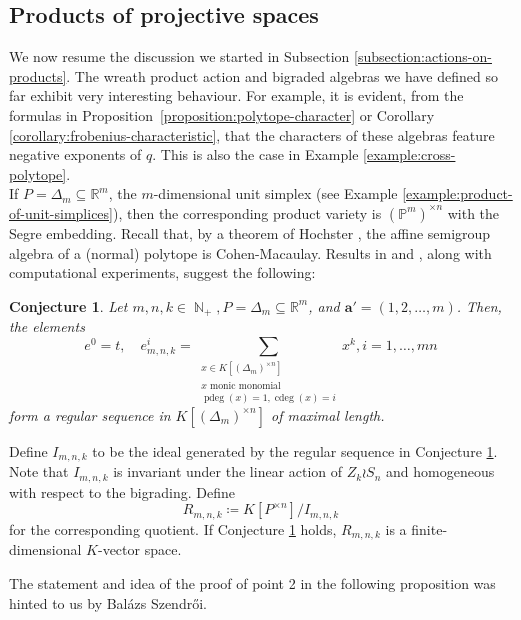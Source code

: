\documentclass[a4paper,12pt]{amsart}
\theoremstyle{plain}
\newtheorem{conjecture}[theorem]{Conjecture}
\theoremstyle{definition}
\theoremstyle{remark}
\DeclareMathOperator{\NN}{\mathbb{N}}
\DeclareMathOperator{\cdeg}{cdeg}
\DeclareMathOperator{\pdeg}{pdeg}
\begin{document}
\subsection{Products of projective spaces}\label{subsection:products-of-projective-spaces}
We now resume the discussion we started in Subsection \ref{subsection:actions-on-products}. The wreath product action and bigraded algebras we have defined so far exhibit very interesting behaviour. For example, it is evident, from the formulas in Proposition~\ref{proposition:polytope-character} or Corollary \ref{corollary:frobenius-characteristic}, that the characters of these algebras feature negative exponents of $q$. This is also the case in Example \ref{example:cross-polytope}. \\

If $P = \Delta_m \subseteq \mathbb{R}^m$, the $m$-dimensional unit simplex (see Example \ref{example:product-of-unit-simplices}), then the corresponding product variety is $(\mathbb{P}^m)^{\times n}$ with the Segre embedding. Recall that, by a theorem of Hochster \cite{hochster-rings}, the affine semigroup algebra of a (normal) polytope is Cohen-Macaulay. Results in \cite{adeyemo-szendroi-refined} and \cite{braun-olsen-statistics}, along with computational experiments, suggest the following:

\begin{conjecture}\label{conjecture:regular-sequence}
    Let $m, n, k \in \NN_+, P = \Delta_m \subseteq \mathbb{R}^m$, and $\bm{a}' = (1, 2,\ldots, m)$. Then, the elements
    \[
    e^0 = t, \quad e^i_{m, n, k} = \sum_{\substack{x \in K[(\Delta_m)^{\times n}]\\x \text{ monic monomial}\\\pdeg(x) = 1, \cdeg(x) = i}} x^k, i = 1, \ldots, mn
    \]
    form a regular sequence in $K[(\Delta_m)^{\times n}]$ of maximal length. 
\end{conjecture}

Define $I_{m, n, k}$ to be the ideal generated by the regular sequence in Conjecture \ref{conjecture:regular-sequence}. Note that $I_{m, n, k}$ is invariant under the linear action of $Z_k \wr S_n$ and homogeneous with respect to the bigrading. Define
\[
R_{m, n, k} \coloneq K[P^{\times n}] / I_{m, n, k}
\]
for the corresponding quotient. If Conjecture \ref{conjecture:regular-sequence} holds, $R_{m, n, k}$ is a finite-dimensional $K$-vector space.

The statement and idea of the proof of point 2 in the following proposition was hinted to us by Balázs Szendrői.
\end{document}
